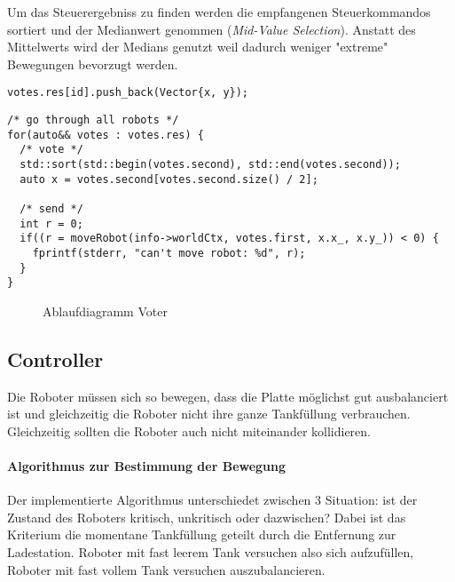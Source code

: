 {Um das Steuerergebniss zu finden werden die empfangenen Steuerkommandos sortiert und der Medianwert genommen 
(\textit{Mid-Value Selection}). Anstatt des Mittelwerts wird der Medians genutzt weil dadurch weniger "extreme"
Bewegungen bevorzugt werden.
\noindent\begin{minipage}{.30\textwidth}
	\begin{lstlisting}[caption=Sammeln, frame=tlrb, language={[11]C++}]
votes.res[id].push_back(Vector{x, y});
\end{lstlisting}
\end{minipage}\hfill
\begin{minipage}{.60\textwidth}
\begin{lstlisting}[caption=Auswahl, frame=tlrb, language={[11]C++}]
/* go through all robots */
for(auto&& votes : votes.res) {
  /* vote */
  std::sort(std::begin(votes.second), std::end(votes.second));
  auto x = votes.second[votes.second.size() / 2];

  /* send */
  int r = 0;
  if((r = moveRobot(info->worldCtx, votes.first, x.x_, x.y_)) < 0) {
  	fprintf(stderr, "can't move robot: %d", r);
  }
}
\end{lstlisting}
\end{minipage}


\begin{figure}
	\centering
	\caption{Ablaufdiagramm Voter}
	\label{fig:sequence-voter}
\end{figure}
\clearpage %

\subsection{Controller}\label{controller}
Die Roboter m{\"{u}}ssen sich so bewegen, dass die Platte m{\"{o}}glichst gut ausbalanciert
ist und gleichzeitig die Roboter nicht ihre ganze Tankf{\"{u}}llung verbrauchen. Gleichzeitig sollten
die Roboter auch nicht miteinander kollidieren.

\paragraph{Algorithmus zur Bestimmung der Bewegung} Der implementierte Algorithmus unterschiedet zwischen 3 Situation: ist der Zustand des Roboters kritisch,
unkritisch oder dazwischen? Dabei ist das Kriterium die momentane Tankf{\"{u}}llung geteilt durch die Entfernung zur Ladestation. Roboter mit fast leerem Tank
versuchen also sich aufzuf{\"{u}}llen, Roboter mit fast vollem Tank versuchen auszubalancieren.

}
